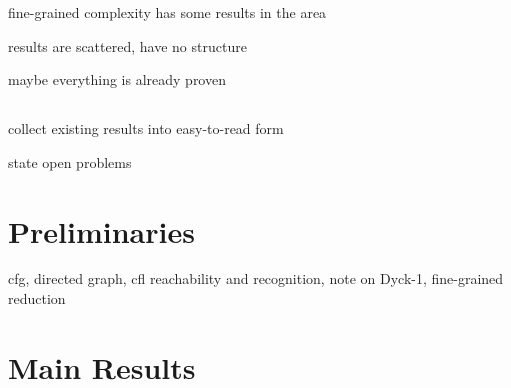 \documentclass[acmsmall,review,nonacm]{acmart}\settopmatter{printfolios=true,printccs=false,printacmref=false}
\begin{document}
	fine-grained complexity has some results in the area
	
	results are scattered, have no structure
	
	maybe everything is already proven
	
	\subsection{}
	
	collect existing results into easy-to-read form
	
	state open problems
	
	\section{Preliminaries}
	
	cfg, directed graph, cfl reachability and recognition, note on Dyck-1, fine-grained reduction
	
	\section{Main Results}
	
\end{document}
